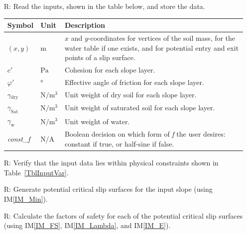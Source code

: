\documentclass[12pt]{article}
\renewcommand{\arraystretch}{1}
\newcommand{\iref}[1]{IM\ref{#1}}
\newcounter{reqnum} %
\newcounter{tablenum} %
\begin{document}
\noindent \begin{itemize}


\item[R\refstepcounter{reqnum}\thereqnum \label{R_Inputs}:] Read the
  inputs, shown in the table below, and store the data.
  \begin{table}[!h]
  \renewcommand{\arraystretch}{1.5}
  \noindent \begin{tabularx}{1.0\textwidth}{l l X} \toprule \textbf{Symbol} &
    {tablenum}  \label{Table:Inputs}
    \textbf{Unit} & \textbf{Description}\\ \midrule
    $\left(x,y\right)$ & $\text{m}$ & $x$ and $y$-coordinates for vertices
    of the soil mass, for the water table if one exists, and for potential 
    entry and exit points of a slip surface.\\
    $c'$ & $\si{\pascal}$ & Cohesion for each slope layer. \\
    $\varphi'$ & \si{\degree} & Effective angle of friction for each
    slope layer. \\
    $\gamma{}_{\text{dry}}$ & $\si{\newton\per\meter\cubed}$ & Unit weight of 
    dry
    soil for each slope layer. \\
    $\gamma_{\text{Sat}}$ & $\si{\newton\per\meter\cubed}$ & Unit
    weight of saturated soil for each slope layer. \\
    $\gamma_{\text{w}}$ & $\si{\newton\per\meter\cubed}$ & Unit
    weight of water. \\
    \textit{const\_f} & N/A & Boolean decision on which form of \textit{f} 
    the user desires: constant if true, or half-sine if false.\\ \bottomrule
\end{tabularx}
\end{table}

\item[R\refstepcounter{reqnum}\thereqnum \label{R_VerifyInput}:] Verify that 
the input data lies within physical constraints shown in 
Table~\ref{TblInputVar}.

\item[R\refstepcounter{reqnum}\thereqnum \label{R_InitGen}:] Generate
potential critical slip surfaces for the input slope (using \iref{IM_Min}). 

\item[R\refstepcounter{reqnum}\thereqnum \label{R_FS}:] Calculate the
  factors of safety for each of the potential critical slip surfaces (using 
  \iref{IM_FS}, \iref{IM_Lambda}, and \iref{IM_E}).


\end{itemize}
\end{document}
